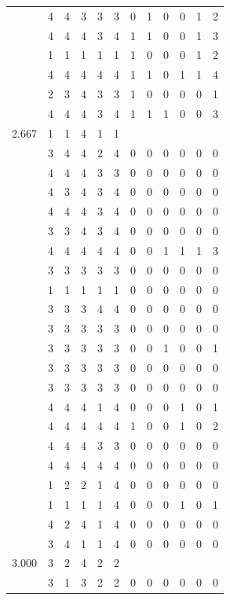 \documentclass[]{msu-thesis}
\theoremstyle{definition}
\theoremstyle{definition}
\theoremstyle{definition}
\theoremstyle{remark}
\begin{document}
\begin{table}
{\begin{tabular}[t]{rrrrrrrrrrrr}
 & 4 & 4 & 3 & 3 & 3 & 0 & 1 & 0 & 0 & 1 & 2\\
 & 4 & 4 & 4 & 3 & 4 & 1 & 1 & 0 & 0 & 1 & 3\\
 & 1 & 1 & 1 & 1 & 1 & 1 & 0 & 0 & 0 & 1 & 2\\
 & 4 & 4 & 4 & 4 & 4 & 1 & 1 & 0 & 1 & 1 & 4\\
 & 2 & 3 & 4 & 3 & 3 & 1 & 0 & 0 & 0 & 0 & 1\\
 & 4 & 4 & 4 & 3 & 4 & 1 & 1 & 1 & 0 & 0 & 3\\
2.667 & 1 & 1 & 4 & 1 & 1 &  &  &  &  &  & \\
 & 3 & 4 & 4 & 2 & 4 & 0 & 0 & 0 & 0 & 0 & 0\\
 & 4 & 4 & 4 & 3 & 3 & 0 & 0 & 0 & 0 & 0 & 0\\
 & 4 & 3 & 4 & 3 & 4 & 0 & 0 & 0 & 0 & 0 & 0\\
 & 4 & 4 & 4 & 3 & 4 & 0 & 0 & 0 & 0 & 0 & 0\\
 & 3 & 3 & 4 & 3 & 4 & 0 & 0 & 0 & 0 & 0 & 0\\
 & 4 & 4 & 4 & 4 & 4 & 0 & 0 & 1 & 1 & 1 & 3\\
 & 3 & 3 & 3 & 3 & 3 & 0 & 0 & 0 & 0 & 0 & 0\\
 & 1 & 1 & 1 & 1 & 1 & 0 & 0 & 0 & 0 & 0 & 0\\
 & 3 & 3 & 3 & 4 & 4 & 0 & 0 & 0 & 0 & 0 & 0\\
 & 3 & 3 & 3 & 3 & 3 & 0 & 0 & 0 & 0 & 0 & 0\\
 & 3 & 3 & 3 & 3 & 3 & 0 & 0 & 1 & 0 & 0 & 1\\
 & 3 & 3 & 3 & 3 & 3 & 0 & 0 & 0 & 0 & 0 & 0\\
 & 3 & 3 & 3 & 3 & 3 & 0 & 0 & 0 & 0 & 0 & 0\\
 & 4 & 4 & 4 & 1 & 4 & 0 & 0 & 0 & 1 & 0 & 1\\
 & 4 & 4 & 4 & 4 & 4 & 1 & 0 & 0 & 1 & 0 & 2\\
 & 4 & 4 & 4 & 3 & 3 & 0 & 0 & 0 & 0 & 0 & 0\\
 & 4 & 4 & 4 & 4 & 4 & 0 & 0 & 0 & 0 & 0 & 0\\
 & 1 & 2 & 2 & 1 & 4 & 0 & 0 & 0 & 0 & 0 & 0\\
 & 1 & 1 & 1 & 1 & 4 & 0 & 0 & 0 & 1 & 0 & 1\\
 & 4 & 2 & 4 & 1 & 4 & 0 & 0 & 0 & 0 & 0 & 0\\
 & 3 & 4 & 1 & 1 & 4 & 0 & 0 & 0 & 0 & 0 & 0\\
3.000 & 3 & 2 & 4 & 2 & 2 &  &  &  &  &  & \\
 & 3 & 1 & 3 & 2 & 2 & 0 & 0 & 0 & 0 & 0 & 0\\

\end{tabular}}
\end{table}
\end{document}
